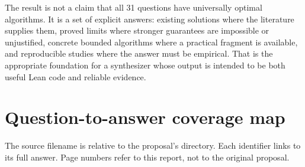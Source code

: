 \documentclass[11pt,a4paper]{article}
\theoremstyle{definition}
\theoremstyle{remark}
\begin{document}
The result is not a claim that all 31 questions have universally optimal algorithms. It is a set of explicit answers: existing solutions where the literature supplies them, proved limits where stronger guarantees are impossible or unjustified, concrete bounded algorithms where a practical fragment is available, and reproducible studies where the answer must be empirical. That is the appropriate foundation for a synthesizer whose output is intended to be both useful Lean code and reliable evidence.

\appendix
\section{Question-to-answer coverage map}\label{app:coverage}

The source filename is relative to the proposal's  directory. Each identifier links to its full answer. Page numbers refer to this report, not to the original proposal.
\end{document}

